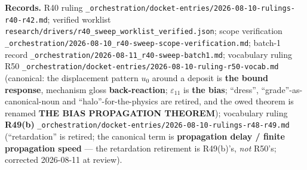 \noindent\textbf{Records.} R40 ruling \texttt{\_orchestration/docket-entries/2026-08-10-rulings-r40-r42.md}; verified worklist
\texttt{research/drivers/r40\_sweep\_worklist\_verified.json}; scope verification \texttt{\_orchestration/2026-08-10\_r40-sweep-scope-verification.md};
batch-1 record \texttt{\_orchestration/2026-08-11\_r40-sweep-batch1.md}; vocabulary ruling R50
\texttt{\_orchestration/docket-entries/2026-08-10-ruling-r50-vocab.md} (canonical: the displacement pattern $u_0$ around a deposit is
\textbf{the bound response}, mechanism gloss \textbf{back-reaction}; $\varepsilon_{11}$ is
\textbf{the bias}; ``dress'', ``grade''-as-canonical-noun and ``halo''-for-the-physics are
retired, and the owed theorem is renamed \textbf{THE BIAS PROPAGATION THEOREM}); vocabulary ruling
\textbf{R49(b)} \texttt{\_orchestration/docket-entries/2026-08-10-rulings-r48-r49.md}
(``retardation'' is retired; the canonical term is \textbf{propagation delay / finite propagation
speed} --- the retardation retirement is R49(b)'s, \emph{not} R50's; corrected 2026-08-11 at review).

